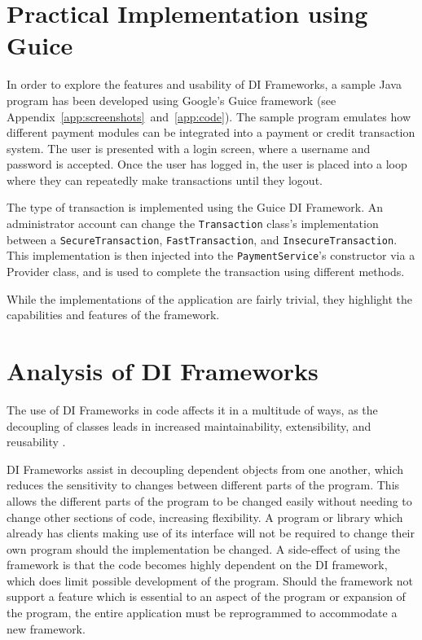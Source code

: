 \documentclass[12pt,twocolumn]{IEEEtran}
\begin{document}
\section{Practical Implementation using Guice}\label{sec:guice}

In order to explore the features and usability of DI Frameworks, a sample Java program has been developed using Google's Guice framework (see Appendix~\ref{app:screenshots}~and~\ref{app:code}). %
The sample program emulates how different payment modules can be integrated into a payment or credit transaction system. The user is presented with a login screen, where a username and password is accepted. Once the user has logged in, the user is placed into a loop where they can repeatedly make transactions until they logout. 

The type of transaction is implemented using the Guice DI Framework. An administrator account can change the \verb|Transaction| class's implementation between a \verb|SecureTransaction|, \verb|FastTransaction|, and \verb|InsecureTransaction|. This implementation is then injected into the \verb|PaymentService|'s constructor via a Provider class, and is used to complete the transaction using different methods. 


While the implementations of the application are fairly trivial, they highlight the capabilities and features of the framework.

\section{Analysis of DI Frameworks}\label{sec:analysis}

The use of DI Frameworks in code affects it in a multitude of ways, as the decoupling of classes leads in increased maintainability, extensibility, and reusability \cite{hongyulyangewantemperohaydenmelton2008,ekaterinarazinadavidjanzen2007}. 

DI Frameworks assist in decoupling dependent objects from one another, which reduces the sensitivity to changes between different parts of the program. This allows the different parts of the program to be changed easily without needing to change other sections of code, increasing flexibility. A program or library which already has clients making use of its interface will not be required to change their own program should the implementation be changed. A side-effect of using the framework is that the code becomes highly dependent on the DI framework, which does limit possible development of the program. Should the framework not support a feature which is essential to an aspect of the program or expansion of the program, the entire application must be reprogrammed to accommodate a new framework.
\end{document}

